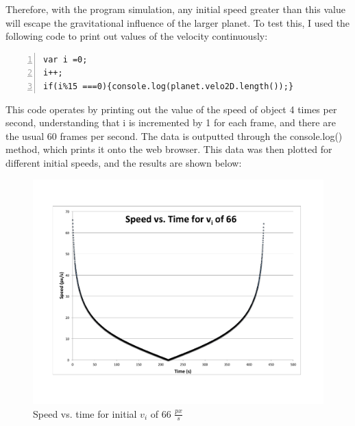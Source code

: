 Therefore, with the program simulation, any initial speed greater than this value will escape the gravitational influence of the larger planet.  To test this, I used the following code to print out values of the velocity continuously:

\begin{lstlisting}[breaklines=true, frame=single, numbers=left, caption=Code for printing out values of speed, label=lst:changestoorbit]
var i =0;
i++;
if(i%15 ===0){console.log(planet.velo2D.length());}
\end{lstlisting}

This code operates by printing out the value of the speed of object 4 times per second, understanding that i is incremented by 1 for each frame, and there are the usual 60 frames per second.  The data is outputted through the console.log() method, which prints it onto the web browser.  This data was then plotted for different initial speeds, and the results are shown below:


\begin{figure}[h] 
	\centering
		\includegraphics[width=12cm]{Figures/fig1.pdf}

	\caption{Speed vs. time for initial $v_i$ of 66 $\frac{px}{s}$}
	\label{fig:data1}
\end{figure}


